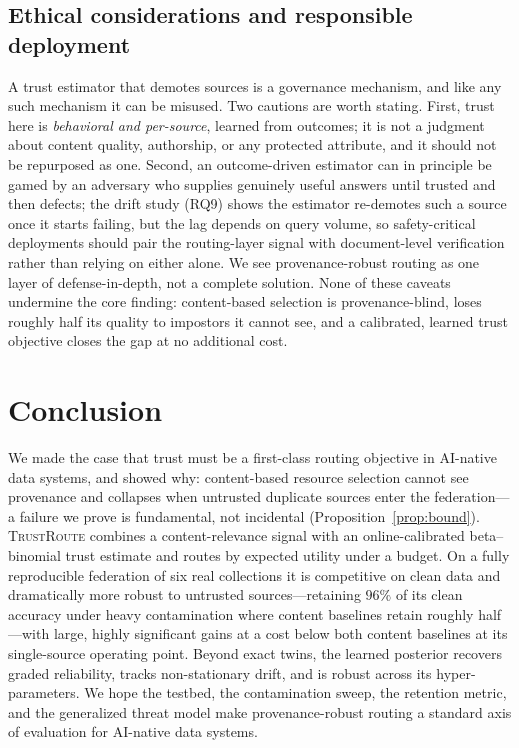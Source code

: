 \documentclass[preprint,12pt]{elsarticle}
\newcommand{\system}{\textsc{TrustRoute}}
\begin{document}
\subsection{Ethical considerations and responsible deployment}
A trust estimator that demotes sources is a governance mechanism, and like any
such mechanism it can be misused. Two cautions are worth stating. First, trust
here is \emph{behavioral and per-source}, learned from outcomes; it is not a
judgment about content quality, authorship, or any protected attribute, and it
should not be repurposed as one. Second, an outcome-driven estimator can in
principle be gamed by an adversary who supplies genuinely useful answers until
trusted and then defects; the drift study (RQ9) shows the estimator re-demotes
such a source once it starts failing, but the lag depends on query volume, so
safety-critical deployments should pair the routing-layer signal with
document-level verification~\cite{zhong2023corpus,zou2025poisonedrag} rather than
relying on either alone. We see provenance-robust routing as one layer of
defense-in-depth, not a complete solution. None of these caveats undermine the
core finding: content-based selection is provenance-blind, loses roughly half its
quality to impostors it cannot see, and a calibrated, learned trust objective
closes the gap at no additional cost.

\section{Conclusion}\label{sec:conclusion}

We made the case that trust must be a first-class routing objective in AI-native
data systems, and showed why: content-based resource selection cannot see
provenance and collapses when untrusted duplicate sources enter the federation---
a failure we prove is fundamental, not incidental (Proposition~\ref{prop:bound}).
\system{} combines a content-relevance signal with an online-calibrated
beta--binomial trust estimate and routes by expected utility under a budget. On a
fully reproducible federation of six real collections it is competitive on clean
data and dramatically more robust to untrusted sources---retaining $96\%$ of its
clean accuracy under heavy contamination where content baselines retain roughly
half---with large, highly significant gains at a cost below both content
baselines at its single-source operating point. Beyond exact twins, the learned posterior recovers graded reliability,
tracks non-stationary drift, and is robust across its hyper-parameters. We hope
the testbed, the contamination sweep, the retention metric, and the generalized
threat model make provenance-robust routing a standard axis of evaluation for
AI-native data systems.
\end{document}
